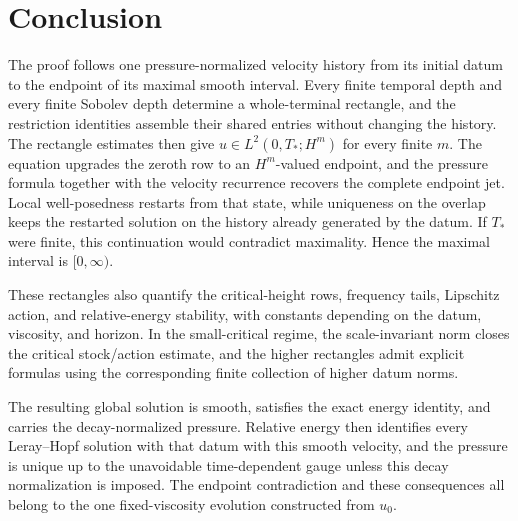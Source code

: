 \section{Conclusion}

The proof follows one pressure-normalized velocity history from its initial
datum to the endpoint of its maximal smooth interval.  Every finite temporal
depth and every finite Sobolev depth determine a whole-terminal rectangle,
and the restriction identities assemble their shared entries without changing
the history.  The rectangle estimates then give
\(u\in L^2(0,T_*;H^m)\) for every finite \(m\).  The equation upgrades the
zeroth row to an \(H^m\)-valued endpoint, and the pressure formula together
with the velocity recurrence recovers the complete endpoint jet.  Local
well-posedness restarts from that state, while uniqueness on the overlap keeps
the restarted solution on the history already generated by the datum.  If
\(T_*\) were finite, this continuation would contradict maximality.  Hence the
maximal interval is \([0,\infty)\).

These rectangles also quantify the critical-height rows, frequency tails,
Lipschitz action, and relative-energy stability, with constants depending on
the datum, viscosity, and horizon.  In the small-critical regime, the
scale-invariant norm closes the critical stock/action estimate, and the higher
rectangles admit explicit formulas using the corresponding finite collection
of higher datum norms.

The resulting global solution is smooth, satisfies the exact energy identity,
and carries the decay-normalized pressure.  Relative energy then identifies
every Leray--Hopf solution with that datum with this smooth velocity, and
the pressure is unique up to the unavoidable time-dependent gauge unless this decay normalization is imposed.  The endpoint contradiction and these
consequences all belong to the one fixed-viscosity evolution constructed from
\(u_0\).
